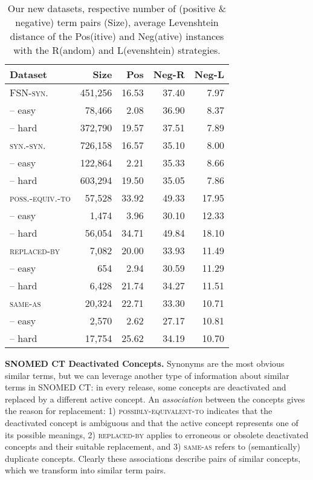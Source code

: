 \documentclass[letterpaper]{article} %
\newcommand{\dataset}[1]{\textsc{#1}}
\begin{document}
\begin{table}[th]
    \centering
    \footnotesize
    \begin{tabular}{l r r r r}
     \toprule
        \textbf{Dataset} & \textbf{Size}  & \textbf{Pos} & \textbf{Neg-R} & \textbf{Neg-L}\\
        \midrule
        \dataset{FSN-syn.} & 451,256 & 16.53 & 37.40 & 7.97\\
        -- easy & 78,466 & 2.08 & 36.90 & 8.37\\
        -- hard & 372,790 & 19.57 & 37.51 & 7.89\\
        \midrule
        \dataset{syn.-syn.} & 726,158 & 16.57 & 35.10 & 8.00 \\
        -- easy & 122,864 & 2.21 & 35.33 & 8.66\\
        -- hard & 603,294 & 19.50 & 35.05 & 7.86\\
        \midrule
        \dataset{poss.-equiv.-to} & 57,528 & 33.92 & 49.33 & 17.95\\
        -- easy & 1,474 & 3.96 & 30.10 & 12.33\\
        -- hard & 56,054 & 34.71 & 49.84 & 18.10\\
        \midrule
        \dataset{replaced-by} & 7,082 & 20.00 & 33.93 & 11.49\\
        -- easy & 654 & 2.94 & 30.59 & 11.29\\
        -- hard & 6,428 & 21.74 & 34.27 & 11.51\\
        \midrule
        \dataset{same-as} & 20,324 & 22.71 & 33.30 & 10.71\\
        -- easy & 2,570 & 2.62 & 27.17 & 10.81\\
        -- hard & 17,754 & 25.62 & 34.19 & 10.70\\
        \bottomrule
    \end{tabular}
    \caption{Our new datasets, respective number of (positive \& negative) term pairs (Size), average Levenshtein distance of the Pos(itive) and  Neg(ative) instances with the R(andom) and L(evenshtein) strategies.}
    \label{tab:datasets}
\end{table}

\noindent \textbf{SNOMED CT Deactivated Concepts.}
Synonyms are the most obvious similar terms, but
 we can leverage another type of information about similar terms in SNOMED CT: in every release, some concepts are deactivated and replaced by a different active concept. An \emph{association} between the concepts gives the reason for replacement: 1) \dataset{possibly-equivalent-to} indicates that the deactivated concept is ambiguous and that the active concept represents one of its possible meanings, 
2) \dataset{replaced-by} applies to erroneous or obsolete deactivated concepts and their suitable replacement, and
3) \dataset{same-as} refers to (semantically) duplicate concepts.
Clearly these associations describe pairs of similar concepts, which we transform into similar term pairs.
\end{document}
